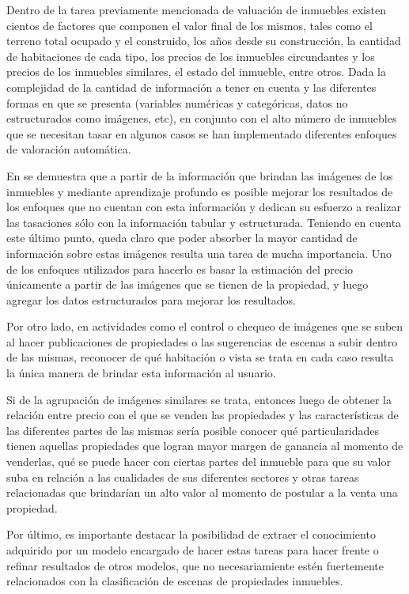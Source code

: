 Dentro de la tarea previamente mencionada de valuación de inmuebles existen cientos de factores que componen el valor final de los mismos, tales como el terreno total ocupado y el construido, los años desde su construcción, la cantidad de habitaciones de cada tipo, los precios de los inmuebles circundantes y los precios de los inmuebles similares, el estado del inmueble, entre otros. Dada la complejidad de la cantidad de información a tener en cuenta y las diferentes formas en que se presenta (variables numéricas y categóricas, datos no estructurados como imágenes, etc), en conjunto con el alto número de inmuebles que se necesitan tasar en algunos casos se han implementado diferentes enfoques de valoración automática.

En \cite{vision_based_real_estate_price_estimation} se demuestra que a partir de la información que brindan las imágenes de los inmuebles y mediante aprendizaje profundo es posible mejorar los resultados de los enfoques que no cuentan con esta información y dedican su esfuerzo a realizar las tasaciones sólo con la información tabular y estructurada. 
Teniendo en cuenta este último punto, queda claro que poder absorber la mayor cantidad de información sobre estas imágenes resulta una tarea de mucha importancia. Uno de los enfoques utilizados para hacerlo es basar la estimación del precio únicamente a partir de las imágenes que se tienen de la propiedad, y luego agregar los datos estructurados para mejorar los resultados.

Por otro lado, en actividades como el control o chequeo de imágenes que se suben al hacer publicaciones de propiedades o las sugerencias de escenas a subir dentro de las mismas, reconocer de qué habitación o vista se trata en cada caso resulta la única manera de brindar esta información al usuario.

Si de la agrupación de imágenes similares se trata, entonces luego de obtener la relación entre precio con el que se venden las propiedades y las características de las diferentes partes de las mismas sería posible conocer qué particularidades tienen aquellas propiedades que logran mayor margen de ganancia al momento de venderlas, qué se puede hacer con ciertas partes del inmueble para que su valor suba en relación a las cualidades de sus diferentes sectores y otras tareas relacionadas que brindarían un alto valor al momento de postular a la venta una propiedad.

Por último, es importante destacar la posibilidad de extraer el conocimiento adquirido por un modelo encargado de hacer estas tareas para hacer frente o refinar resultados de otros modelos, que no necesariamiente estén fuertemente relacionados con la clasificación de escenas de propiedades inmuebles.

